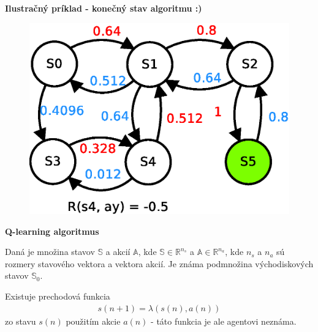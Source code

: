 \documentclass[xcolor=dvipsnames]{beamer}
\begin{document}
\begin{frame}{\bf Ilustračný príklad - konečný stav algoritmu :)}

\begin{figure}[!htb]
\includegraphics[scale=.5]{../diagrams/q_learning_table_06.eps}
\end{figure}

\end{frame}



\begin{frame}{\bf Q-learning algoritmus}

Daná je množina stavov $\mathbb{S}$ a akcií $\mathbb{A}$, kde
 $\mathbb{S} \in \mathbb{R}^{n_s}$ a $\mathbb{A} \in \mathbb{R}^{n_a}$, kde
$n_s$ a  $n_a$ sú rozmery stavového vektora a vektora akcií. Je známa podmnožina východiskových
stavov $\mathbb{S}_0$.

Existuje prechodová funkcia
\begin{align}
        s(n+1) = \lambda(s(n), a(n))
\end{align}
zo stavu $s(n)$ použitím akcie $a(n)$ - táto funkcia je ale agentovi neznáma.







\end{frame}
\end{document}
